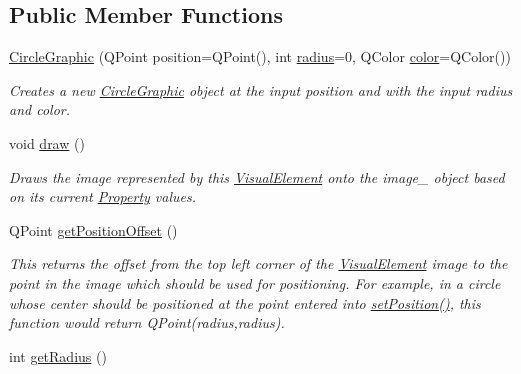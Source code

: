 \subsection*{Public Member Functions}
\begin{DoxyCompactItemize}
\item 
\hyperlink{class_picto_1_1_circle_graphic_a51b8520d228061ccaaf0b7c6c2e84bc1}{Circle\-Graphic} (Q\-Point position=Q\-Point(), int \hyperlink{class_picto_1_1_circle_graphic_a574ae580b977bfec39184f209f816cab}{radius}=0, Q\-Color \hyperlink{struct_picto_1_1_visual_element_a45c3042c969717eb2ab60373369c7de7}{color}=Q\-Color())
\begin{DoxyCompactList}\small\item\em Creates a new \hyperlink{class_picto_1_1_circle_graphic}{Circle\-Graphic} object at the input position and with the input radius and color. \end{DoxyCompactList}\item 
\hypertarget{class_picto_1_1_circle_graphic_a4520b34a4d921797e1bf7ab2706fc420}{void \hyperlink{class_picto_1_1_circle_graphic_a4520b34a4d921797e1bf7ab2706fc420}{draw} ()}\label{class_picto_1_1_circle_graphic_a4520b34a4d921797e1bf7ab2706fc420}

\begin{DoxyCompactList}\small\item\em Draws the image represented by this \hyperlink{struct_picto_1_1_visual_element}{Visual\-Element} onto the image\-\_\- object based on its current \hyperlink{class_picto_1_1_property}{Property} values. \end{DoxyCompactList}\item 
\hypertarget{class_picto_1_1_circle_graphic_a810bf16539f19b64ee16c0cc9b1aabb6}{Q\-Point \hyperlink{class_picto_1_1_circle_graphic_a810bf16539f19b64ee16c0cc9b1aabb6}{get\-Position\-Offset} ()}\label{class_picto_1_1_circle_graphic_a810bf16539f19b64ee16c0cc9b1aabb6}

\begin{DoxyCompactList}\small\item\em This returns the offset from the top left corner of the \hyperlink{struct_picto_1_1_visual_element}{Visual\-Element} image to the point in the image which should be used for positioning. For example, in a circle whose center should be positioned at the point entered into \hyperlink{struct_picto_1_1_visual_element_a454cc96862097e96a0b0f1d2c83e23ed}{set\-Position()}, this function would return Q\-Point(radius,radius). \end{DoxyCompactList}\item 
\hypertarget{class_picto_1_1_circle_graphic_a26a5a35821c92b51afbe15771ceef375}{int \hyperlink{class_picto_1_1_circle_graphic_a26a5a35821c92b51afbe15771ceef375}{get\-Radius} ()}\label{class_picto_1_1_circle_graphic_a26a5a35821c92b51afbe15771ceef375}


\end{DoxyCompactItemize}
